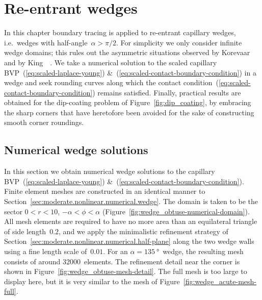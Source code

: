 \chapter{Re-entrant wedges}
\label{ch:re-entrant}

In this chapter
boundary tracing is applied to re-entrant capillary wedges,
i.e.~wedges with half-angle~$\alpha > \pi/2$.
For simplicity we only consider infinite wedge domains;
this rules out the asymmetric situations observed by
Korevaar~\cite{korevaar-1980-capillary-re-entrant-corner}
and by King~\etal~\cite{king-1999-laplace-young-near-corner}.
We take a numerical solution to
the scaled capillary BVP~(\ref{eq:scaled-laplace-young})
\&~(\ref{eq:scaled-contact-boundary-condition})
in a wedge
and seek rounding curves along which
the contact condition~(\ref{eq:scaled-contact-boundary-condition})
remains satisfied.
Finally, practical results are obtained for the dip-coating problem
of Figure~\ref{fig:dip_coating},
by embracing the sharp corners
that have heretofore been avoided
for the sake of constructing smooth corner roundings.

\section{Numerical wedge solutions}
\label{sec:re-entrant.numerical}

In this section we obtain numerical wedge solutions
to the capillary BVP~(\ref{eq:scaled-laplace-young})
\&~(\ref{eq:scaled-contact-boundary-condition}).
Finite element meshes are constructed in an identical manner
to Section~\ref{sec:moderate.nonlinear.numerical.wedge}.
The domain is taken to be the sector $0 < r < 10$, $-\alpha < \phi < \alpha$
(Figure~\ref{fig:wedge_obtuse-numerical-domain}).
All mesh elements are required to have no more area
than an equilateral triangle of side length~$0.2$,
and we apply the minimalistic refinement strategy
of Section~\ref{sec:moderate.nonlinear.numerical.half-plane}
along the two wedge walls
using a fine length scale of~$0.01$.
For an $\alpha = \SI{135}{\degree}$~wedge,
the resulting mesh consists of around 32000~elements.
The refinement detail near the corner
is shown in Figure~\ref{fig:wedge_obtuse-mesh-detail}.
The full mesh is too large to display here,
but it is very similar to the mesh of Figure~\ref{fig:wedge_acute-mesh-full}.

\begin{figure}
  \begin{minipage}[t]{0.48\textwidth}
  \end{minipage}
  \hfill
  \begin{minipage}[t]{0.48\textwidth}
  \end{minipage}
\end{figure}

